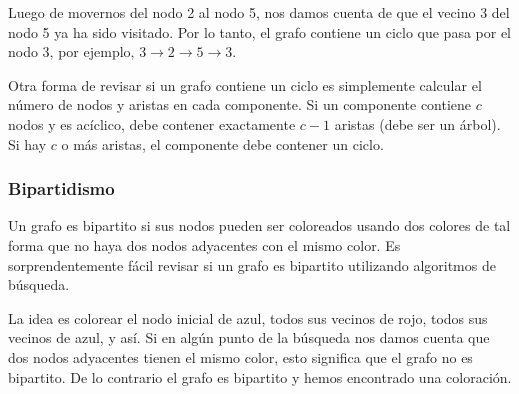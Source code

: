 Luego de movernos del nodo 2 al nodo 5, nos damos cuenta
de que el vecino 3 del nodo 5 ya ha sido visitado. Por
lo tanto, el grafo contiene un ciclo que pasa por el nodo 3,
por ejemplo, $3 \rightarrow 2 \rightarrow 5 \rightarrow 3$.

Otra forma de revisar si un grafo contiene un ciclo es
simplemente calcular el número de nodos y aristas en cada
componente. Si un componente contiene $c$ nodos y es acíclico,
debe contener exactamente $c-1$ aristas (debe ser un árbol).
Si hay $c$ o más aristas, el componente debe contener un ciclo.

\subsubsection{Bipartidismo}


Un grafo es bipartito si sus nodos pueden ser coloreados
usando dos colores de tal forma que no haya dos nodos adyacentes
con el mismo color. Es sorprendentemente fácil revisar si un
grafo es bipartito utilizando algoritmos de búsqueda.

La idea es colorear el nodo inicial de azul, todos sus vecinos
de rojo, todos sus vecinos de azul, y así. Si en algún punto de la
búsqueda nos damos cuenta que dos nodos adyacentes tienen el mismo
color, esto significa que el grafo no es bipartito. De lo contrario
el grafo es bipartito y hemos encontrado una coloración.


